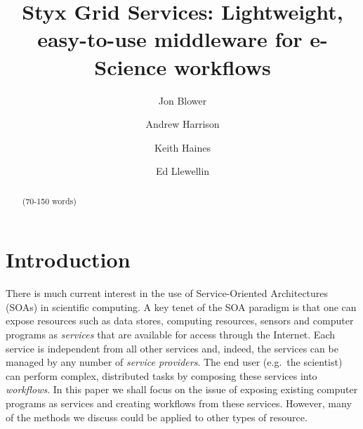 \documentclass{llncs}
\begin{document}
%
\title{Styx Grid Services: Lightweight, easy-to-use middleware for e-Science workflows}
%
%
\author{Jon Blower \and Andrew Harrison
\and Keith Haines \and Ed Llewellin}
%
%
%

\maketitle              %

\begin{abstract}
(70-150 words)
\end{abstract}
%
\section{Introduction}
There is much current interest in the use of Service-Oriented Architectures (SOAs) in scientific computing.  A key tenet of the SOA paradigm is that one can expose resources such as data stores, computing resources, sensors and computer programs as {\em services\/} that are available for access through the Internet.  Each service is independent from all other services and, indeed, the services can be managed by any number of {\em service providers\/}.  The end user (e.g.\ the scientist) can perform complex, distributed tasks by composing these services into {\em workflows\/}.  In this paper we shall focus on the issue of exposing existing computer programs as services and creating workflows from these services.  However, many of the methods we discuss could be applied to other types of resource.
\end{document}
